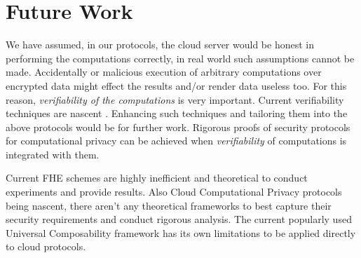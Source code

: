 \documentclass[conference]{IEEEtran}
\numberwithin{equation}{section}
\begin{document}
\section{Future Work}
 We have assumed, in our protocols, the cloud server would be honest in performing the computations correctly, in real world such assumptions cannot be made. Accidentally or malicious execution of arbitrary computations over encrypted data might effect the results and/or render data useless too. For this reason, \emph{verifiability of the computations} is very important. Current verifiability techniques are nascent \cite{gennaro2010non}\cite{benabbas2011verifiable}\cite{chung2010improved}. Enhancing such techniques and tailoring them into the above protocols would be for further work. Rigorous proofs of security protocols for computational privacy can be achieved when \emph{verifiability} of computations is integrated with them.
 
 Current FHE schemes are highly inefficient and theoretical to conduct experiments and provide results. Also Cloud Computational Privacy protocols being nascent, there aren't any theoretical frameworks to best capture their security requirements and conduct rigorous analysis. The current popularly used Universal Composability framework has its own limitations \cite{canetti2003limitations} to be applied directly to cloud protocols.
\end{document}
